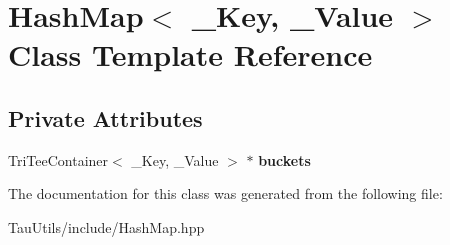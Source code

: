 \hypertarget{class_hash_map}{}\section{Hash\+Map$<$ \+\_\+\+Key, \+\_\+\+Value $>$ Class Template Reference}
\label{class_hash_map}
\subsection*{Private Attributes}
\begin{DoxyCompactItemize}
\item 
\mbox{\label{class_hash_map_a710f7ddf0ec0678e5619fc7c65b1367d}} 
Tri\+Tee\+Container$<$ \+\_\+\+Key, \+\_\+\+Value $>$ $\ast$ {\bfseries buckets}
\end{DoxyCompactItemize}


The documentation for this class was generated from the following file\+:\begin{DoxyCompactItemize}
\item 
Tau\+Utils/include/Hash\+Map.\+hpp\end{DoxyCompactItemize}
